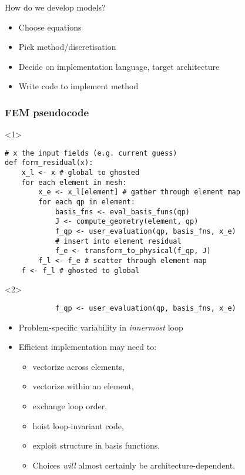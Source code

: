 \documentclass[presentation]{beamer}
\begin{document}
\begin{frame}
  How do we develop models?

  \begin{itemize}
  \item Choose equations
  \item Pick method/discretisation
  \item Decide on implementation language, target architecture
  \item Write code to implement method
  \end{itemize}
\end{frame}

\begin{frame}[fragile]
  \frametitle{FEM pseudocode}

  \begin{onlyenv}<1>
\begin{verbatim}
# x the input fields (e.g. current guess)
def form_residual(x):
    x_l <- x # global to ghosted
    for each element in mesh:
        x_e <- x_l[element] # gather through element map
        for each qp in element:
            basis_fns <- eval_basis_funs(qp)
            J <- compute_geometry(element, qp)
            f_qp <- user_evaluation(qp, basis_fns, x_e)
            # insert into element residual
            f_e <- transform_to_physical(f_qp, J)
        f_l <- f_e # scatter through element map
    f <- f_l # ghosted to global
\end{verbatim}
  \end{onlyenv}

  \begin{onlyenv}<2>
\begin{verbatim}
            f_qp <- user_evaluation(qp, basis_fns, x_e)
\end{verbatim}
    \begin{itemize}
    \item Problem-specific variability in \emph{innermost} loop
    \item Efficient implementation may need to:
      \begin{itemize}
      \item vectorize across elements,
      \item vectorize within an element,
      \item exchange loop order,
      \item hoist loop-invariant code,
      \item exploit structure in basis functions.
      \item Choices \emph{will} almost certainly be architecture-dependent.
      \end{itemize}
    \end{itemize}
  \end{onlyenv}
\end{frame}
\end{document}
